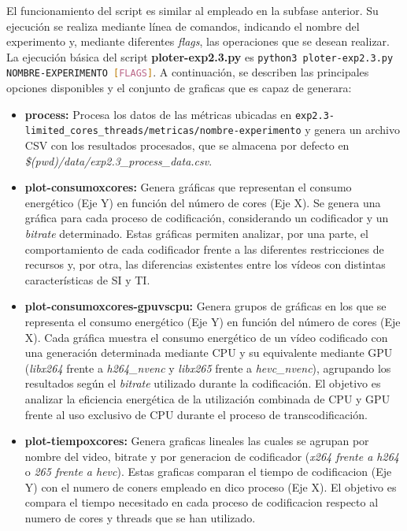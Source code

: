 El funcionamiento del script es similar al empleado en la subfase anterior. Su ejecución se realiza mediante línea de comandos, indicando el nombre del experimento y, mediante diferentes \textit{flags}, las operaciones que se desean realizar. La ejecución básica del script \textbf{ploter-exp2.3.py} es \lstinline[language=sh]{python3 ploter-exp2.3.py NOMBRE-EXPERIMENTO [FLAGS]}. A continuación, se describen las principales opciones disponibles y el conjunto de graficas que es capaz de generara:

\begin{itemize}
 \item \textbf{process:} Procesa los datos de las métricas ubicadas en \lstinline[language=sh]{exp2.3-limited_cores_threads/metricas/nombre-experimento} y genera un archivo CSV con los resultados procesados, que se almacena por defecto en \textit{\$(pwd)/data/exp2.3\_process\_data.csv}.
 
 \item \textbf{plot-consumoxcores:} Genera gráficas que representan el consumo energético (Eje Y) en función del número de cores (Eje X). Se genera una gráfica para cada proceso de codificación, considerando un codificador y un \textit{bitrate} determinado. Estas gráficas permiten analizar, por una parte, el comportamiento de cada codificador frente a las diferentes restricciones de recursos y, por otra, las diferencias existentes entre los vídeos con distintas características de SI y TI.
 
 \item \textbf{plot-consumoxcores-gpuvscpu:} Genera grupos de gráficas en los que se representa el consumo energético (Eje Y) en función del número de cores (Eje X). Cada gráfica muestra el consumo energético de un vídeo codificado con una generación determinada mediante CPU y su equivalente mediante GPU (\textit{libx264} frente a \textit{h264\_nvenc} y \textit{libx265} frente a \textit{hevc\_nvenc}), agrupando los resultados según el \textit{bitrate} utilizado durante la codificación. El objetivo es analizar la eficiencia energética de la utilización combinada de CPU y GPU frente al uso exclusivo de CPU durante el proceso de transcodificación.

 \item \textbf{plot-tiempoxcores:} Genera graficas lineales las cuales se agrupan por nombre del video, bitrate y por generacion de codificador (\textit{x264 frente a h264} o \textit{265 frente a hevc}). Estas graficas comparan el tiempo de codificacion (Eje Y) con el numero de coners empleado en dico proceso (Eje X). El objetivo es compara el tiempo necesitado en cada proceso de codificacion respecto al numero de cores y threads que se han utilizado. 


\end{itemize}
